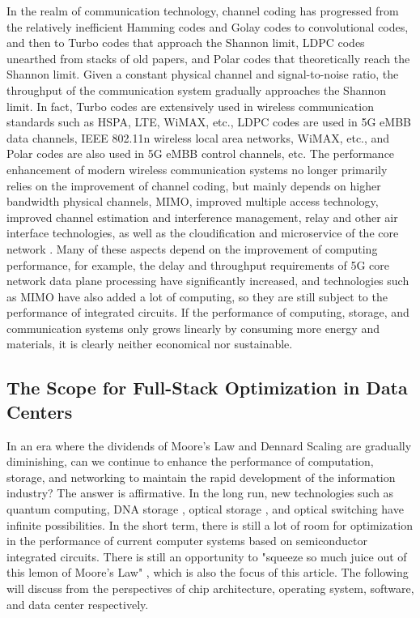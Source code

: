 In the realm of communication technology, channel coding has progressed from the relatively inefficient Hamming codes and Golay codes to convolutional codes, and then to Turbo codes that approach the Shannon limit, LDPC codes unearthed from stacks of old papers, and Polar codes that theoretically reach the Shannon limit. Given a constant physical channel and signal-to-noise ratio, the throughput of the communication system gradually approaches the Shannon limit.
In fact, Turbo codes are extensively used in wireless communication standards such as HSPA, LTE, WiMAX, etc., LDPC codes are used in 5G eMBB data channels, IEEE 802.11n wireless local area networks, WiMAX, etc., and Polar codes are also used in 5G eMBB control channels, etc.
The performance enhancement of modern wireless communication systems no longer primarily relies on the improvement of channel coding, but mainly depends on higher bandwidth physical channels, MIMO, improved multiple access technology, improved channel estimation and interference management, relay and other air interface technologies, as well as the cloudification and microservice of the core network \cite{3gpp-23501,3gpp-38300}. Many of these aspects depend on the improvement of computing performance, for example, the delay and throughput requirements of 5G core network data plane processing have significantly increased, and technologies such as MIMO have also added a lot of computing, so they are still subject to the performance of integrated circuits.
If the performance of computing, storage, and communication systems only grows linearly by consuming more energy and materials, it is clearly neither economical nor sustainable.

\subsection{The Scope for Full-Stack Optimization in Data Centers}

In an era where the dividends of Moore's Law and Dennard Scaling are gradually diminishing, can we continue to enhance the performance of computation, storage, and networking to maintain the rapid development of the information industry? The answer is affirmative. In the long run, new technologies such as quantum computing, DNA storage \cite{bornholt2016dna}, optical storage \cite{glass-a-new-media-for-a-new-era}, and optical switching \cite{farrington2011helios} have infinite possibilities. In the short term, there is still a lot of room for optimization in the performance of current computer systems based on semiconductor integrated circuits. There is still an opportunity to "squeeze so much juice out of this lemon of Moore's Law" \cite{threebody}, which is also the focus of this article. The following will discuss from the perspectives of chip architecture, operating system, software, and data center respectively.

